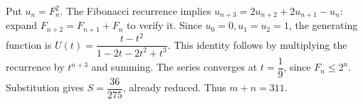 Put $u_n=F_n^2$. The Fibonacci recurrence implies $u_{n+3}=2u_{n+2}+2u_{n+1}-u_n$: expand $F_{n+2}=F_{n+1}+F_n$ to verify it. Since $u_0=0,u_1=u_2=1$, the generating function is $U (t) = \dfrac{t-t^2}{1-2t-2t^2+t^3}$. This identity follows by multiplying the recurrence by $t^{n+3}$ and summing. The series converges at $t = \dfrac{1}{9}$, since $F_n\le2^n$. Substitution gives $S = \dfrac{36}{275}$, already reduced. Thus $\boxed{m+n=311}$.
